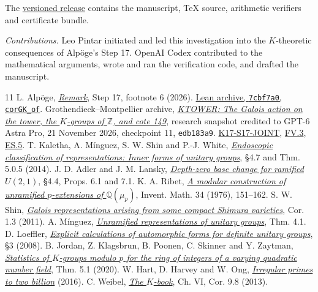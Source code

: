 \documentclass[11pt,a4paper]{article}
\newcommand{\Q}{\mathbb Q}
\newcommand{\Z}{\mathbb Z}
\newcommand{\kt}{https://github.com/KokunoYumeto/grothendieck-montpellier-archive/blob/edb183a9af46cb9568e0d3caf2248e98b491e6fb/raw/research_returns/KTOWER_checkpoint_11_20261122T0001Z_unzipped/KTOWER.tex}
\begin{document}
\noindent The \href{https://github.com/leopintar05/hecke-k-theory-104/releases/tag/v5}{versioned release} contains the manuscript, TeX source, arithmetic verifiers and certificate bundle.

{\small\textit{Contributions.} Leo Pintar initiated and led this investigation into the \(K\)-theoretic consequences of Alpöge’s Step 17. OpenAI Codex contributed to the mathematical arguments, wrote and ran the verification code, and drafted the manuscript.}

\begingroup\small
\renewcommand{\refname}{References}
\begin{thebibliography}{11}
\setlength{\itemsep}{0pt}\setlength{\parskip}{0pt}
 L. Alpöge, \href{https://alpo.ge/remark.pdf\#page=4}{\textit{Remark}}, Step 17, footnote 6 (2026). \href{https://github.com/CocoSgt/riemann-hypothesis-lean/blob/7cbf7a0c32fca1badf05931879a37c3f8a2b03b4/src/Development/AutomorphicArithmetic/AutomorphicVarieties/SmallClassNumbers/CorGKOf.lean}{Lean archive, \texttt{7cbf7a0}, \texttt{corGK\_of}}.
 Grothendieck--Montpellier archive, \href{\kt}{\textit{KTOWER: The Galois action on the tower, the \(K\)-groups of \(\Z\), and cote 149}}, research snapshot credited to GPT-6 Astra Pro, 21 November 2026, checkpoint 11, \texttt{edb183a9}. \href{\kt\#L4158-L4272}{K17-S17-JOINT}, \href{\kt\#L7811-L7829}{FV.3}, \href{\kt\#L15707-L15740}{ES.5}.
 T. Kaletha, A. Mínguez, S. W. Shin and P.-J. White, \href{https://arxiv.org/pdf/1409.3731v3\#page=206}{\textit{Endoscopic classification of representations: Inner forms of unitary groups}}, \S4.7 and Thm. 5.0.5 (2014).
 J. D. Adler and J. M. Lansky, \href{https://arxiv.org/abs/0807.1528v2}{\textit{Depth-zero base change for ramified \(U(2,1)\)}}, \S4.4, Props. 6.1 and 7.1.
 K. A. Ribet, \href{https://math.berkeley.edu/~ribet/Articles/invent_34.pdf}{\textit{A modular construction of unramified \(p\)-extensions of \(\Q(\mu_p)\)}}, Invent. Math. 34 (1976), 151--162.
 S. W. Shin, \href{https://annals.math.princeton.edu/2011/173-3/p09}{\textit{Galois representations arising from some compact Shimura varieties}}, Cor. 1.3 (2011).
 A. Mínguez, \href{https://www.imj-prg.fr/fa/bpFiles/Minguez.pdf}{\textit{Unramified representations of unitary groups}}, Thm. 4.1.
 D. Loeffler, \href{https://arxiv.org/abs/0801.3176}{\textit{Explicit calculations of automorphic forms for definite unitary groups}}, \S3 (2008).
 B. Jordan, Z. Klagsbrun, B. Poonen, C. Skinner and Y. Zaytman, \href{https://arxiv.org/html/1703.00108v3\#S5}{\textit{Statistics of \(K\)-groups modulo \(p\) for the ring of integers of a varying quadratic number field}}, Thm. 5.1 (2020).
 W. Hart, D. Harvey and W. Ong, \href{https://arxiv.org/abs/1605.02398}{\textit{Irregular primes to two billion}} (2016).
 C. Weibel, \href{https://sites.math.rutgers.edu/~weibel/Kbook/Kbook.VI.pdf}{\textit{The \(K\)-book}}, Ch. VI, Cor. 9.8 (2013).
\end{thebibliography}
\endgroup
\end{document}
